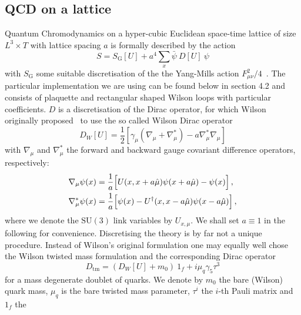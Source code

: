 \subsection{QCD on a lattice}

Quantum Chromodynamics on a hyper-cubic Euclidean space-time lattice
of size $L^3\times T$ with lattice spacing $a$ is formally described
by the action
\begin{equation}
  \label{eq:action}
  S = S_\mathrm{G}[U] + a^4 \sum_x \bar\psi\ D[U]\ \psi
\end{equation}
with $S_\mathrm{G}$ some suitable discretisation of the the Yang-Mills
action $F_{\mu\nu}^2/4$~\cite{Yang:1954ek}. The particular
implementation we are  using can be found below in section 4.2 and
consists of  plaquette and rectangular shaped Wilson loops with
particular  coefficients. $D$ is a discretisation of the Dirac
operator, for which Wilson originally proposed~\cite{Wilson:1974sk} to
use the 
so called Wilson Dirac operator
\begin{equation}
  \label{eq:DW}
  D_W[U] = \frac{1}{2}\left[\gamma_\mu\left(\nabla_\mu +
    \nabla^*_\mu\right) -a\nabla^*_\mu\nabla_\mu \right]
\end{equation}
with $\nabla_\mu$ and $\nabla_\mu^*$
the forward and backward gauge covariant difference operators,
respectively:
\begin{equation}
  \label{eq:covariant}
  \begin{split}
  \nabla_\mu\psi(x) &= \frac{1}{a}\Bigl[U(x,x+a\hat \mu)\psi(x+a \hat \mu) -
  \psi(x)\Bigr]\, , \\    
  \nabla_\mu^* \psi(x) &=
  \frac{1}{a}\Bigl[\psi(x)-U^\dagger(x,x-a\hat\mu)\psi(x-a\hat\mu)\Bigr]\, ,\\
  \end{split}
\end{equation}
where we denote the $\mathrm{SU}(3)$ link variables by $U_{x,\mu}$.
We shall set $a\equiv 1$ in the following for convenience. 
Discretising the theory is by far not a unique procedure. Instead of Wilson's
original formulation one may equally well chose the 
Wilson twisted mass formulation and the corresponding Dirac
operator~\cite{Frezzotti:2000nk}
\begin{equation}
  \label{eq:Dtm}
  D_\mathrm{tm} = (D_W[U] + m_0)\ 1_f + i \mu_q\gamma_5\tau^3
\end{equation}
for a mass degenerate doublet of quarks. We denote by $m_0$ the bare
(Wilson) quark mass, $\mu_q$ is the bare twisted
mass parameter, $\tau^i$ the $i$-th Pauli matrix and $1_f$ the
